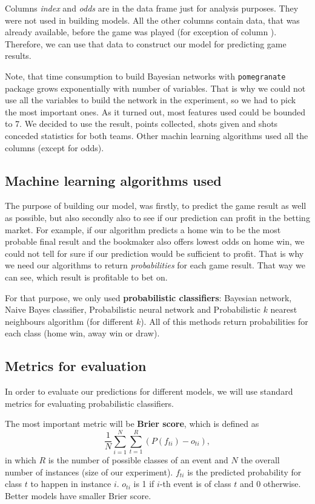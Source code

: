 \documentclass[conference]{IEEEtran}
\begin{document}
Columns \textit{index} and \textit{odds} are in the data frame just for analysis purposes. They were not used in building models.
All the other columns contain data, that was already available, before the game was played (for exception of column ). Therefore, we can use that data to construct our model for predicting game results.

Note, that time consumption to build Bayesian networks with
\texttt{pomegranate} package grows exponentially with number of 
variables. That is why we could not use all the variables to build the network
in the experiment,
so we had to pick the most important ones. As it turned out, most 
features used could be bounded to 7. We decided to use the 
result, points collected, shots given and shots conceded statistics
for both teams. Other machin learning algorithms used all the columns (except 
for odds).

\subsection{Machine learning algorithms used}

The purpose of building our model, was firstly, to predict the game result as well as possible, but also secondly also to see if our
prediction can profit in the betting market. For example, if our algorithm predicts a home win to be the most probable final 
result and the bookmaker also offers lowest odds on home win, we could not tell for sure if our prediction would be sufficient to
profit. That is why we need our algorithms to return \textit{probabilities} for each game result. That way we can see, which result is profitable to bet on.

For that purpose, we only used \textbf{probabilistic classifiers}: Bayesian network, Naive Bayes classifier, Probabilistic neural 
network and Probabilistic $k$ nearest neighbours algorithm (for different $k$). All of this methods return probabilities for each
class (home win, away win or draw).

\subsection{Metrics for evaluation}

In order to evaluate our predictions for different models, we will use standard metrics for evaluating probabilistic classifiers. 

The most important metric will be \textbf{Brier score}, which is defined as 
$$\frac{1}{N} \sum_{i=1}^{N} \sum_{t=1}^{R} {(P(f_{ti}) - o_{ti})},$$ in which $R$ is the number of possible classes of an event and $N$ the overall number of instances (size of our experiment). $f_{ti}$ is the predicted probability for class $t$ to 
happen in instance $i$. $o_{ti}$ is 1 if $i$-th event is of class $t$ and 0 otherwise. Better models have smaller Brier score.
\end{document}
